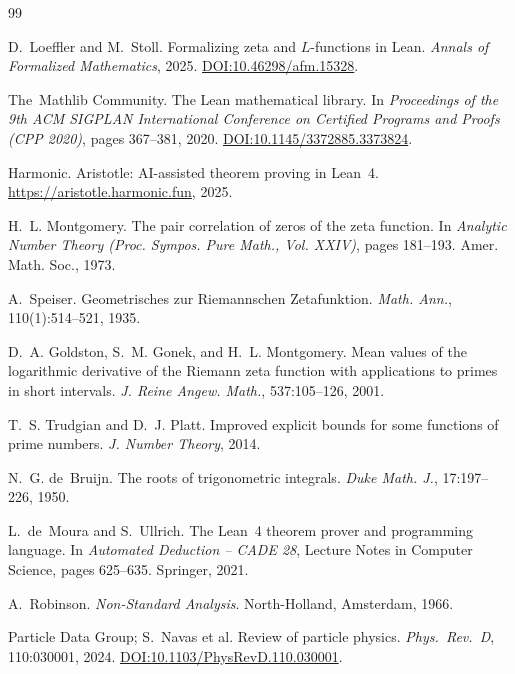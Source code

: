 \documentclass[12pt, a4paper]{article}
\theoremstyle{plain}
\theoremstyle{definition}
\begin{document}

\begin{thebibliography}{99}

D.~Loeffler and M.~Stoll.
\newblock Formalizing zeta and $L$-functions in {Lean}.
\newblock \emph{Annals of Formalized Mathematics}, 2025.
\newblock \href{https://doi.org/10.46298/afm.15328}{DOI:10.46298/afm.15328}.

The~Mathlib Community.
\newblock The {Lean} mathematical library.
\newblock In \emph{Proceedings of the 9th ACM SIGPLAN International
  Conference on Certified Programs and Proofs (CPP 2020)}, pages 367--381, 2020.
\newblock \href{https://doi.org/10.1145/3372885.3373824}{DOI:10.1145/3372885.3373824}.

Harmonic.
\newblock Aristotle: {AI}-assisted theorem proving in {Lean~4}.
\newblock \url{https://aristotle.harmonic.fun}, 2025.

H.~L. Montgomery.
\newblock The pair correlation of zeros of the zeta function.
\newblock In \emph{Analytic Number Theory (Proc. Sympos. Pure Math., Vol. XXIV)},
  pages 181--193. Amer. Math. Soc., 1973.

A.~Speiser.
\newblock Geometrisches zur {Riemannschen} {Zetafunktion}.
\newblock \emph{Math. Ann.}, 110(1):514--521, 1935.

D.~A. Goldston, S.~M. Gonek, and H.~L. Montgomery.
\newblock Mean values of the logarithmic derivative of the {Riemann} zeta
  function with applications to primes in short intervals.
\newblock \emph{J. Reine Angew. Math.}, 537:105--126, 2001.

T.~S. Trudgian and D.~J. Platt.
\newblock Improved explicit bounds for some functions of prime numbers.
\newblock \emph{J. Number Theory}, 2014.

N.~G. de~Bruijn.
\newblock The roots of trigonometric integrals.
\newblock \emph{Duke Math. J.}, 17:197--226, 1950.

L.~de~Moura and S.~Ullrich.
\newblock The {Lean~4} theorem prover and programming language.
\newblock In \emph{Automated Deduction -- CADE 28}, Lecture Notes in
  Computer Science, pages 625--635. Springer, 2021.

A.~Robinson.
\newblock \emph{Non-Standard Analysis}.
\newblock North-Holland, Amsterdam, 1966.

Particle Data Group; S.~Navas et al.
\newblock Review of particle physics.
\newblock \emph{Phys.\ Rev.\ D}, 110:030001, 2024.
\newblock \href{https://doi.org/10.1103/PhysRevD.110.030001}{DOI:10.1103/PhysRevD.110.030001}.

\end{thebibliography}
\end{document}
